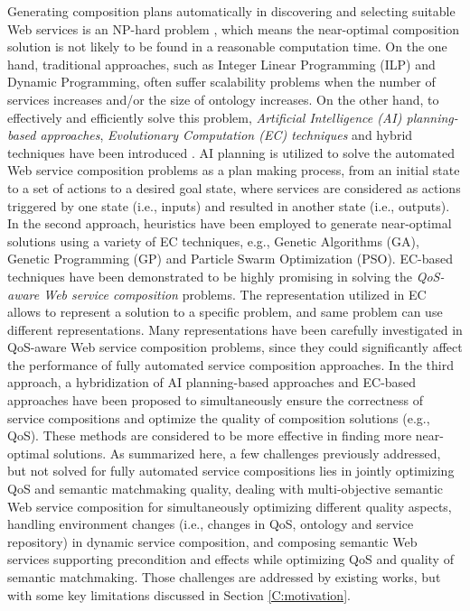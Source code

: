 Generating composition plans automatically in discovering and selecting suitable Web services is an NP-hard problem \cite{moghaddam2014service}, which means the near-optimal composition solution is not likely to be found in a reasonable computation time. On the one hand, traditional approaches, such as Integer Linear Programming (ILP) and Dynamic Programming, often suffer scalability problems when the number of services increases and/or the size of ontology increases. On the other hand, to effectively and efficiently solve this problem, \emph{Artificial Intelligence (AI) planning-based approaches}, \emph{Evolutionary Computation (EC) techniques} and hybrid techniques have been introduced \cite{peer2005web,wang2012survey}. AI planning is utilized to solve the automated Web service composition problems as a plan making process, from an initial state to a set of actions to a desired goal state, where services are considered as actions triggered by one state (i.e., inputs) and resulted in another state (i.e., outputs). In the second approach, heuristics have been employed to generate near-optimal solutions using a variety of EC techniques, e.g., Genetic Algorithms (GA), Genetic Programming (GP) and Particle Swarm Optimization (PSO). EC-based techniques have been demonstrated to be highly promising in solving the \emph{QoS-aware Web service composition} problems. The representation utilized in EC allows to represent a solution to a specific problem, and same problem can use different representations. Many representations have been carefully investigated in QoS-aware Web service composition problems, since they could significantly affect the performance of fully automated service composition approaches. In the third approach, a hybridization of AI planning-based approaches and EC-based approaches \cite{da2016genetic,ma2015hybrid} have been proposed to simultaneously ensure the correctness of service compositions and optimize the quality of composition solutions (e.g., QoS). These methods are considered to be more effective in finding more near-optimal solutions. As summarized here, a few challenges previously addressed, but not solved for fully automated service compositions lies in jointly optimizing QoS and semantic matchmaking quality, dealing with multi-objective semantic Web service composition for simultaneously optimizing different quality aspects, handling environment changes (i.e., changes in QoS, ontology and service repository) in dynamic service composition, and composing semantic Web services supporting precondition and effects while optimizing QoS and quality of semantic matchmaking. Those challenges are addressed by existing works, but with some key limitations discussed in Section \ref{C:motivation}. 

